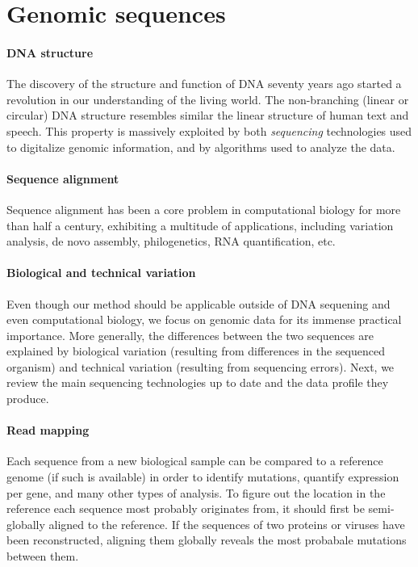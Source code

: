 \section*{Genomic sequences}

\paragraph{DNA structure}
The discovery of the structure and function of DNA\citep{watson1953structure}
seventy years ago started a revolution in our understanding of the living world.
The non-branching (linear or circular) DNA structure resembles similar the
linear structure of human text and speech. This property is massively exploited
by both \emph{sequencing} technologies used to digitalize genomic information,
and by algorithms used to analyze the data.

\paragraph{Sequence alignment}
Sequence alignment has been a core problem in computational biology for more
than half a century, exhibiting a multitude of applications, including variation
analysis, de novo assembly, philogenetics, RNA quantification, etc.

\paragraph{Biological and technical variation}
Even though our method should be applicable outside of DNA sequening and even
computational biology, we focus on genomic data for its immense practical
importance. More generally, the differences between the two sequences are
explained by biological variation (resulting from differences in the sequenced
organism) and technical variation (resulting from sequencing errors). Next, we
review the main sequencing technologies up to date and the data profile they
produce.

\paragraph{Read mapping}
Each sequence from a new biological sample can be compared to a reference genome
(if such is available) in order to identify mutations, quantify expression per
gene, and many other types of analysis. To figure out the location in the
reference each sequence most probably originates from, it should first be
semi-globally aligned to the reference. If the sequences of two proteins or
viruses have been reconstructed, aligning them globally reveals the most
probabale mutations between them.

